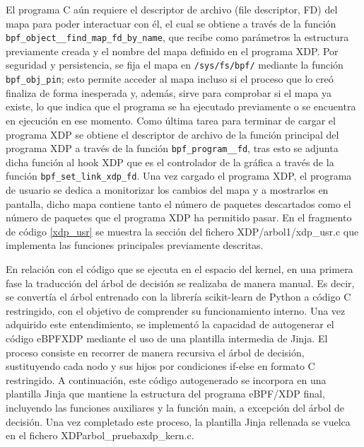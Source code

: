 El programa C aún requiere el descriptor de archivo (file descriptor, FD) del mapa para poder interactuar con él, el cual se obtiene a través de la función \verb|bpf_object__find_map_fd_by_name|, que recibe como parámetros la estructura previamente creada y el nombre del mapa definido en el programa XDP. Por seguridad y persistencia, se fija el mapa en \verb|/sys/fs/bpf/| mediante la función \verb|bpf_obj_pin|; esto permite acceder al mapa incluso si el proceso que lo creó finaliza de forma inesperada y, además, sirve para comprobar si el mapa ya existe, lo que indica que el programa se ha ejecutado previamente o se encuentra en ejecución en ese momento. Como última tarea para terminar de cargar el programa XDP se obtiene el descriptor de archivo de la función principal del programa XDP a través de la función \verb|bpf_program__fd|, tras esto se adjunta dicha función al hook XDP que es el controlador de la gráfica a través de la función \verb|bpf_set_link_xdp_fd|. Una vez cargado el programa XDP, el programa de usuario se dedica a monitorizar los cambios del mapa y a mostrarlos en pantalla, dicho mapa contiene tanto el número de paquetes descartados como el número de paquetes que el programa XDP ha permitido pasar. En el fragmento de código \ref{xdp_usr} se muestra la sección del fichero XDP/arbol1/xdp\_usr.c que implementa las funciones principales previamente descritas.


En relación con el código que se ejecuta en el espacio del kernel, en una primera fase la traducción del árbol de decisión se realizaba de manera manual. Es decir, se convertía el árbol entrenado con la librería scikit-learn de Python a código C restringido, con el objetivo de comprender su funcionamiento interno. Una vez adquirido este entendimiento, se implementó la capacidad de autogenerar el código eBPF\/XDP mediante el uso de una plantilla intermedia de Jinja. El proceso consiste en recorrer de manera recursiva el árbol de decisión, sustituyendo cada nodo y sus hijos por condiciones if-else en formato C restringido. A continuación, este código autogenerado se incorpora en una plantilla Jinja que mantiene la estructura del programa eBPF/XDP final, incluyendo las funciones auxiliares y la función main, a excepción del árbol de decisión. Una vez completado este proceso, la plantilla Jinja rellenada se vuelca en el fichero XDP\/arbol\_prueba\/xdp\_kern.c.

